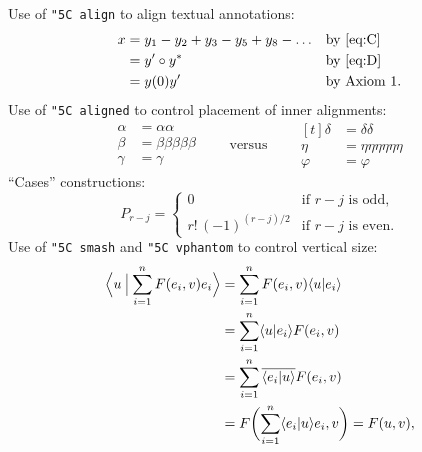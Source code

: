 \documentclass[a4paper]{article}
\newcommand{\cn}[1]{{\tt \char"5C #1}}
\begin{document}
Use of \cn{align} to align textual annotations:
\begin{align}
x& = y_1-y_2+y_3-y_5+y_8-\dots
                    && \text{by \eqref{eq:C}}\\
 & = y'\circ y^*    && \text{by \eqref{eq:D}}\\
 & = y(0) y'        && \text {by Axiom 1.}
\end{align}
Use of \cn{aligned} to control placement of inner alignments:
\begin{equation*}
\begin{aligned}
\alpha&=\alpha\alpha\\
\beta&=\beta\beta\beta\beta\beta\\
\gamma&=\gamma
\end{aligned}
\qquad\text{versus}\qquad
\begin{aligned}[t]
\delta&=\delta\delta\\
\eta&=\eta\eta\eta\eta\eta\eta\\
\varphi&=\varphi
\end{aligned}
\end{equation*}
``Cases'' constructions:
\begin{equation}\label{eq:C}
P_{r-j}=
  \begin{cases}
    0&  \text{if $r-j$ is odd},\\
    r!\,(-1)^{(r-j)/2}&  \text{if $r-j$ is even}.
  \end{cases}
\end{equation}
Use of \cn{smash} and \cn{vphantom} to control vertical size:
\newcommand\ip[2]{\langle #1 \/ | #2 \/\rangle}
\newcommand\Ip[2]{\left\langle{\arraycolsep=0pt %
         \begin{array}{c|c}#1\/\,&\,#2\/\end{array}}%
         \right\rangle}
\newcommand\Ipd[2]{\left\langle{\arraycolsep=0pt %
         \begin{array}{c|c}\displaystyle#1\/\,&\,\displaystyle#2\/\end{array}}%
         \right\rangle}
\newcommand\conj[1]{\overline{#1}}
\begin{align*}
\Ipd{ u\: }{\: \smash{\sum_{i=1}^n F(e_i,v) e_i }\vphantom{\sum}}
&= \sum_{i=1}^n F(e_i,v) \ip{ u }{ e_i } \\ 
&= \sum_{i=1}^n \ip{ u }{ e_i } F(e_i,v) \\ 
&= \sum_{i=1}^n \conj{\ip{ e_i }{ u }} F(e_i,v) \\ 
&= F \biggl( \sum_{i=1}^n \ip{ e_i }{ u } e_i,v\biggr) = F( u, v ),
\end{align*}
\end{document}
